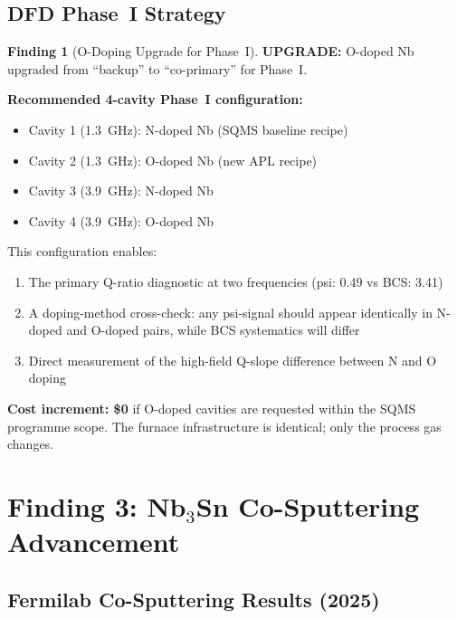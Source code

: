 \documentclass[11pt]{article}
\theoremstyle{definition}
\newtheorem{finding}[theorem]{Finding}
\theoremstyle{remark}
\newcommand{\upgrade}[1]{\textcolor{blue!70!black}{\textbf{UPGRADE:} #1}}
\begin{document}
\subsection{DFD Phase~I Strategy}

\begin{finding}[O-Doping Upgrade for Phase~I]
\label{find:o_doping}
\upgrade{O-doped Nb upgraded from ``backup'' to ``co-primary'' for
Phase~I.}

\textbf{Recommended 4-cavity Phase~I configuration:}
\begin{itemize}[nosep]
\item Cavity 1 (1.3~GHz): N-doped Nb (SQMS baseline recipe)
\item Cavity 2 (1.3~GHz): O-doped Nb (new APL recipe)
\item Cavity 3 (3.9~GHz): N-doped Nb
\item Cavity 4 (3.9~GHz): O-doped Nb
\end{itemize}

This configuration enables:
\begin{enumerate}[nosep]
\item The primary Q-ratio diagnostic at two frequencies
  (psi: 0.49 vs BCS: 3.41)
\item A doping-method cross-check: any psi-signal should appear
  identically in N-doped and O-doped pairs, while BCS systematics
  will differ
\item Direct measurement of the high-field Q-slope difference
  between N and O doping
\end{enumerate}

\textbf{Cost increment: \$0} if O-doped cavities are requested within
the SQMS programme scope. The furnace infrastructure is identical;
only the process gas changes.
\end{finding}


\section{Finding 3: Nb$_3$Sn Co-Sputtering Advancement}
\label{sec:nb3sn_cosputtering}

\subsection{Fermilab Co-Sputtering Results (2025)}
\end{document}
